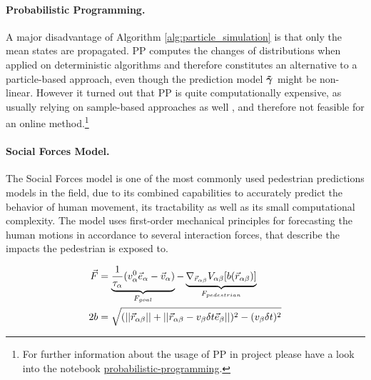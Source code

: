 \paragraph{Probabilistic Programming.} A major disadvantage of Algorithm \ref{alg:particle_simulation} is that only the mean states are propagated. \ac{PP} computes the changes of distributions when applied on deterministic algorithms and therefore constitutes an alternative to a particle-based approach, even though the prediction model $\distmodeldet[]$ might be non-linear. However it turned out that \ac{PP} is quite computationally expensive, as usually relying on sample-based approaches as well \cite{Jensen2007}, and therefore not feasible for an online method.\footnote{For further information about the usage of \ac{PP} in project \project please have a look into the notebook \href{https://github.com/simon-schaefer/mantrap/blob/master/examples/misc/probabilistic_programming.ipynb}{probabilistic-programming}.}

\paragraph{Social Forces Model.} The Social Forces model \cite{Helbing1995} is one of the most commonly used pedestrian predictions models in the field, due to its combined capabilities to accurately predict the behavior of human movement, its tractability as well as its small computational complexity. The model uses first-order mechanical principles for forecasting the human motions in accordance to several interaction forces, that describe the impacts the pedestrian is exposed to. 

\begin{align}
\vec{F} &= \underbrace{\frac{1}{\tau_{\alpha}} (v^0_{\alpha} \vec{e}_{\alpha} - \vec{v}_{\alpha})}_{F_{goal}} - \underbrace{\nabla_{\vec{r}_{\alpha \beta}} V_{\alpha \beta}[b(\vec{r}_{\alpha \beta})]}_{F_{pedestrian}} 
\label{eq:social_forces} \\
2b &= \sqrt{(||\vec{r}_{\alpha \beta}|| + ||\vec{r}_{\alpha \beta} - v_{\beta} \delta t \vec{e}_{\beta}||)^2 - (v_{\beta} \delta t)^2}
\end{align}

